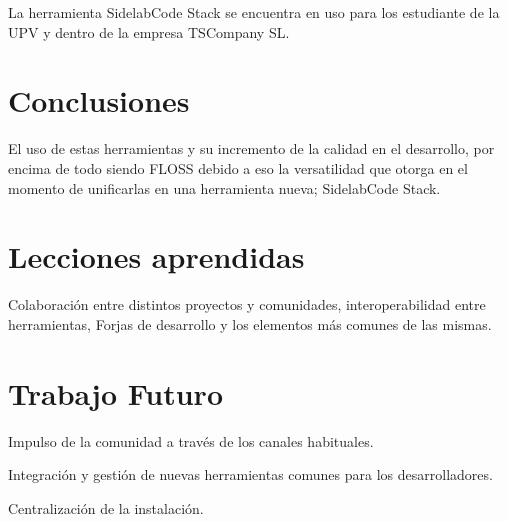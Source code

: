 \documentclass[11pt]{scrartcl}
\begin{document}
\par La herramienta SidelabCode Stack se encuentra en uso para los estudiante de la UPV y dentro de la empresa TSCompany SL.


\section{Conclusiones}
\label{sec:conclusiones}

\par El uso de estas herramientas y su incremento de la calidad en el desarrollo, por encima de todo siendo FLOSS debido a eso la versatilidad que otorga en el momento de unificarlas en una herramienta nueva; SidelabCode Stack.


\section{Lecciones aprendidas}
\label{sec:lecciones}

\par Colaboraci\'on entre distintos proyectos y comunidades, interoperabilidad entre herramientas, Forjas de desarrollo y los elementos m\'as comunes de las mismas.


\section{Trabajo Futuro}
\label{sec:trabajofuturo}

\par Impulso de la comunidad a través de los canales habituales.

\par Integraci\'on y gesti\'on de nuevas herramientas comunes para los desarrolladores.

\par Centralizaci\'on de la instalaci\'on.

\end{document}
